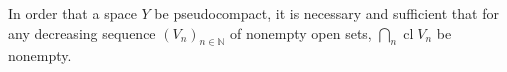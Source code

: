 In order that a space $Y$ be pseudocompact, it is necessary and sufficient that for any decreasing sequence $(V_n)_{n \in \mathbb{N}}$ of nonempty open sets, $\bigcap_n \operatorname{cl} V_n$ be nonempty.
